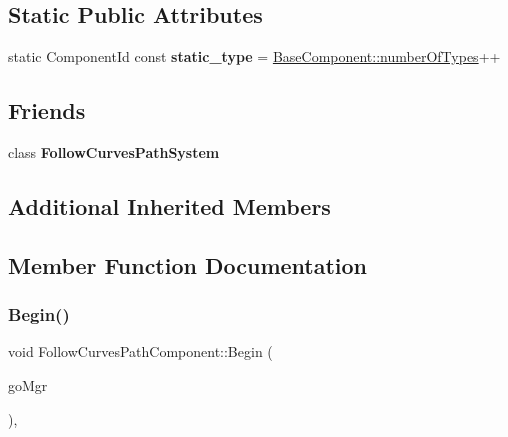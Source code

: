 \subsection*{Static Public Attributes}
\begin{DoxyCompactItemize}
\item 
\mbox{\label{classFollowCurvesPathComponent_a8e9921eb44efb09eb449dbfb106d4162}} 
static Component\+Id const {\bfseries static\+\_\+type} = \hyperlink{classBaseComponent_a084ade347bc71a7f0d3b17ecdc2225a4}{Base\+Component\+::number\+Of\+Types}++
\end{DoxyCompactItemize}
\subsection*{Friends}
\begin{DoxyCompactItemize}
\item 
\mbox{\label{classFollowCurvesPathComponent_a7303da499a5bb9fb502b47f63e2d0ff2}} 
class {\bfseries Follow\+Curves\+Path\+System}
\end{DoxyCompactItemize}
\subsection*{Additional Inherited Members}


\subsection{Member Function Documentation}
\mbox{\label{classFollowCurvesPathComponent_aa66f258486a50ebc5bbbc0cf83c18d9f}} 
\subsubsection{\texorpdfstring{Begin()}{Begin()}}
{\footnotesize\ttfamily void Follow\+Curves\+Path\+Component\+::\+Begin (\begin{DoxyParamCaption}\item[{\hyperlink{classGameObjectManager}{Game\+Object\+Manager} $\ast$}]{go\+Mgr }\end{DoxyParamCaption})\hspace{0.3cm}{\ttfamily [override]}, {\ttfamily [virtual]}}



